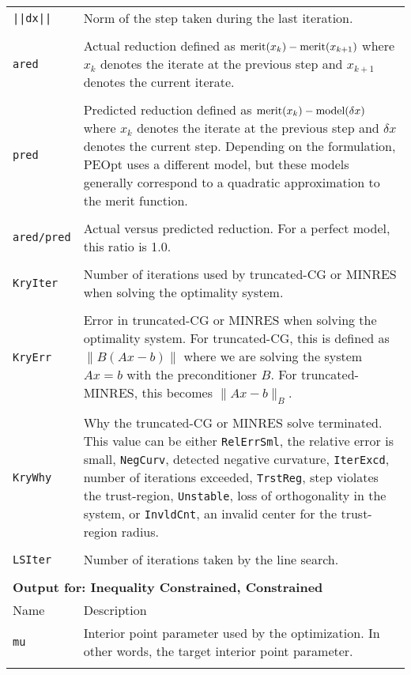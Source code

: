 \documentclass{report}
\begin{document}
\begin{longtable}{lp{}}
\texttt{||dx||} & Norm of the step taken during the last iteration. \\
\\
\texttt{ared} & Actual reduction defined as $\textnormal{merit}(x_k)-\textnormal{merit}(x_{k+1})$ where $x_k$ denotes the iterate at the previous step and $x_{k+1}$ denotes the current iterate.\\
\\
\texttt{pred} & Predicted reduction defined as $\textnormal{merit}(x_k)-\textnormal{model}(\delta x)$ where $x_k$ denotes the iterate at the previous step and $\delta x$ denotes the current step.  Depending on the formulation, PEOpt uses a different model, but these models generally correspond to a quadratic approximation to the merit function.\\
\\
\texttt{ared/pred} & Actual versus predicted reduction.  For a perfect model, this ratio is 1.0.\\
\\
\texttt{KryIter} & Number of iterations used by truncated-CG or MINRES when solving the optimality system.\\
\\
\texttt{KryErr} & Error in truncated-CG or MINRES when solving the optimality system.  For truncated-CG, this is defined as $\|B(Ax-b)\|$ where we are solving the system $Ax=b$ with the preconditioner $B$.  For truncated-MINRES, this becomes $\|Ax-b\|_B$.\\
\\
\texttt{KryWhy} & Why the truncated-CG or MINRES solve terminated.  This value can be either \texttt{RelErrSml}, the relative error is small, \texttt{NegCurv}, detected negative curvature, \texttt{IterExcd}, number of iterations exceeded, \texttt{TrstReg}, step violates the trust-region, \texttt{Unstable}, loss of orthogonality in the system, or \texttt{InvldCnt}, an invalid center for the trust-region radius.\\
\\
\texttt{LSIter} & Number of iterations taken by the line search.\\
\\
\multicolumn{2}{p{\textwidth}}{\bf Output for: Inequality Constrained, Constrained}\\
Name & Description\\
\texttt{mu} & Interior point parameter used by the optimization.  In other words, the target interior point parameter.\\
\\

\end{longtable}
\end{document}
